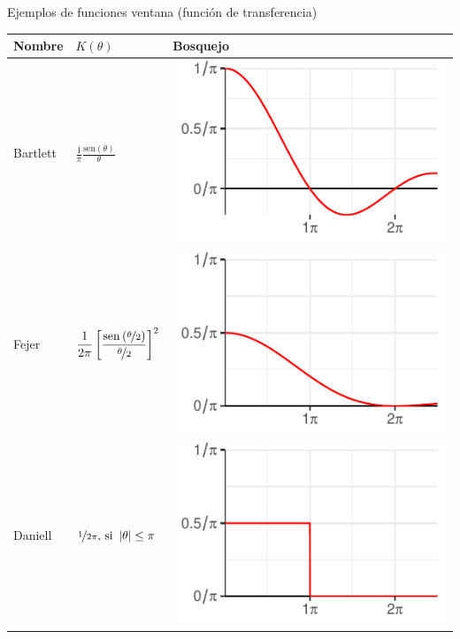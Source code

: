 \documentclass[12pt,letterpaper]{book}
\newcommand{\SEN}[1]{\mathrm{sen}\left( #1 \right)}
\newcommand{\abso}[1]{\left| #1 \right|}
\begin{document}
\begin{SidewaysTable}
\caption{Ejemplos de funciones ventana (función de transferencia)}
\centering
\begin{tabular}{lll}
\toprule
Nombre & $K(\theta)$ & Bosquejo \\
\midrule
Bartlett &
$\displaystyle 
\frac{1}{\pi} \frac{\SEN{\theta}}{\theta}
$
& \includegraphics[scale=.4]{./img_ventanas/ventana_2_bartlett.pdf} \\
\rowcolor{gris}
Fejer &
$\displaystyle 
\frac{1}{2\pi} \left[ \frac{\SEN{\nicefrac{\theta}{2}}}{\nicefrac{\theta}{2}} \right]^{2}
$
& \includegraphics[scale=.4]{./img_ventanas/ventana_2_fejer.pdf} \\
Daniell &
$
\displaystyle 
\nicefrac{1}{2\pi} \text{, si } \abso{\theta}\leq \pi
$
& \includegraphics[scale=.4]{./img_ventanas/ventana_2_daniell.pdf} \\

\end{tabular}
\end{SidewaysTable}
\end{document}
